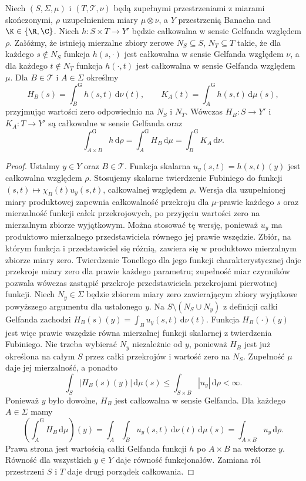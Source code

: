 \begin{twierdzenie}
\label{thm:gelfand-fubini15b}
Niech $(S,\Sigma,\mu)$ i $(T,\mathcal T,\nu)$ będą
zupełnymi przestrzeniami z miarami skończonymi,
$\rho$ uzupełnieniem miary $\mu\otimes\nu$, a $Y$
przestrzenią Banacha nad $\K\in\{\R,\C\}$.
Niech $h:S\times T\to Y'$ będzie całkowalna w sensie
Gelfanda względem $\rho$. Załóżmy, że istnieją
mierzalne zbiory zerowe $N_S\subseteq S$, $N_T\subseteq T$
takie, że dla każdego $s\notin N_S$ funkcja $h(s,\cdot)$
jest całkowalna w sensie Gelfanda względem $\nu$,
a dla każdego $t\notin N_T$ funkcja $h(\cdot,t)$ jest
całkowalna w sensie Gelfanda względem $\mu$.
Dla $B\in\mathcal T$ i $A\in\Sigma$ określmy
\[
 H_B(s)=\int_B^{\mathrm G}h(s,t)\,\mathrm d\nu(t),
 \qquad K_A(t)=\int_A^{\mathrm G}h(s,t)\,\mathrm d\mu(s),
\]
przyjmując wartości zero odpowiednio na $N_S$ i $N_T$.
Wówczas $H_B:S\to Y'$ i $K_A:T\to Y'$ są całkowalne
w sensie Gelfanda oraz
\[
 \int_{A\times B}^{\mathrm G}h\,\mathrm d\rho
 =\int_A^{\mathrm G}H_B\,\mathrm d\mu
 =\int_B^{\mathrm G}K_A\,\mathrm d\nu .
\]
\end{twierdzenie}
\begin{proof}
Ustalmy $y\in Y$ oraz $B\in\mathcal T$.
Funkcja skalarna $u_y(s,t)=h(s,t)(y)$ jest całkowalna
względem $\rho$. Stosujemy skalarne twierdzenie Fubiniego do funkcji
$(s,t)\mapsto\chi_B(t)u_y(s,t)$, całkowalnej względem $\rho$.
Wersja dla uzupełnionej miary produktowej zapewnia
całkowalność przekroju dla $\mu$-prawie każdego $s$
oraz mierzalność funkcji całek przekrojowych, po
przyjęciu wartości zero na mierzalnym zbiorze wyjątkowym.
Można stosować tę wersję, ponieważ $u_y$ ma produktowo
mierzalnego przedstawiciela równego jej prawie wszędzie. Zbiór, na którym funkcja
i przedstawiciel się różnią, zawiera się w produktowo
mierzalnym zbiorze miary zero. Twierdzenie Tonellego
dla jego funkcji charakterystycznej daje przekroje
miary zero dla prawie każdego parametru; zupełność miar
czynników pozwala wówczas zastąpić przekroje przedstawiciela
przekrojami pierwotnej funkcji.
Niech $N_y\in\Sigma$ będzie zbiorem miary zero
zawierającym zbiory wyjątkowe powyższego argumentu
dla ustalonego $y$. Na $S\setminus(N_S\cup N_y)$
z definicji całki Gelfanda zachodzi
$H_B(s)(y)=\int_B u_y(s,t)\,\mathrm d\nu(t)$.
Funkcja $H_B(\cdot)(y)$ jest więc prawie wszędzie
równa mierzalnej funkcji skalarnej z twierdzenia Fubiniego.
Nie trzeba wybierać $N_y$ niezależnie od $y$, ponieważ
$H_B$ jest już określona na całym $S$ przez całki przekrojów
i wartość zero na $N_S$.
Zupełność $\mu$ daje jej mierzalność, a ponadto
\[
 \int_S|H_B(s)(y)|\,\mathrm d\mu(s)
 \le\int_{S\times B}|u_y|\,\mathrm d\rho<\infty.
\]
Ponieważ $y$ było dowolne, $H_B$ jest całkowalna
w sensie Gelfanda. Dla każdego $A\in\Sigma$ mamy
\[
 \left(\int_A^{\mathrm G}H_B\,\mathrm d\mu\right)(y)
 =\int_A\int_B u_y(s,t)\,\mathrm d\nu(t)\,\mathrm d\mu(s)
 =\int_{A\times B}u_y\,\mathrm d\rho.
\]
Prawa strona jest wartością całki Gelfanda funkcji $h$
po $A\times B$ na wektorze $y$. Równość dla wszystkich
$y\in Y$ daje równość funkcjonałów. Zamiana ról
przestrzeni $S$ i $T$ daje drugi porządek całkowania.
\end{proof}

